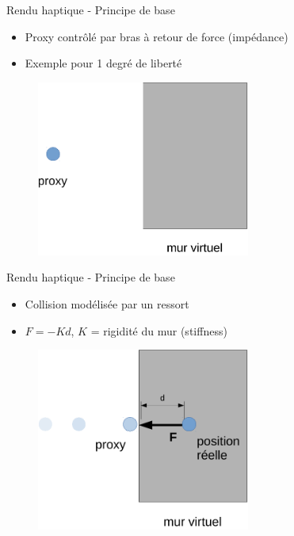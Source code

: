 \documentclass[compress, noflama]{beamer}
\begin{document}
\begin{frame}{Rendu haptique - Principe de base}
\begin{itemize}
\item Proxy contrôlé par bras à retour de force (impédance)
\item Exemple pour 1 degré de liberté
\end{itemize}
\begin{figure}
\centering
\includegraphics[width=7cm]{images/hapticRendering}{}
\end{figure}
\end{frame}

\begin{frame}{Rendu haptique - Principe de base}
\begin{itemize}
\item Collision modélisée par un ressort
\item $F = -Kd$, $K$ = rigidité du mur (stiffness)
\end{itemize}
\begin{figure}
\centering
\includegraphics[width=7cm]{images/hapticRendering2}{}
\end{figure}
\end{frame}
\end{document}
